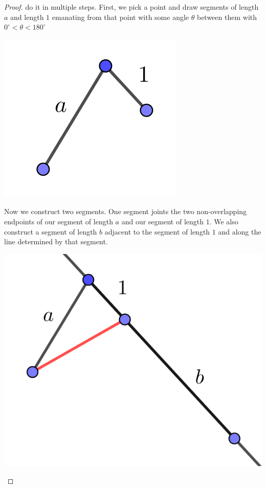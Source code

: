 \documentclass[11pt]{article}
\theoremstyle{definition}
\begin{document}
\begin{proof}
  do it in multiple steps. First, we pick a point and draw segments of length $a$ and length $1$ emanating from that point with some angle $\theta$ between
  them with $0^\circ < \theta < 180^\circ$
  \begin{center}
    \includegraphics[scale=.75]{Images/ab_1.png}
  \end{center}
  Now we construct two segments. One segment joints the two non-overlapping endpoints of our segment of length $a$ and our segment of length $1$. We also construct
  a segment of length $b$ adjacent to the segment of length $1$ and along the line determined by that segment.
  \begin{center}
    \includegraphics[scale=.75]{Images/ab_2.png}
  \end{center}
  \begin{center}

\end{center}
\end{proof}
\end{document}
